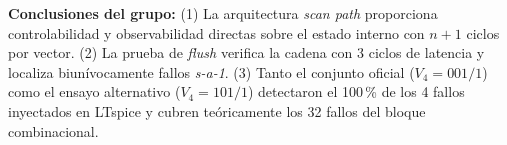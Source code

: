 \documentclass[10pt,a4paper]{article}
\begin{document}
\textbf{Conclusiones del grupo:} (1) La arquitectura \emph{scan path} proporciona controlabilidad y observabilidad directas sobre el estado interno con $n+1$ ciclos por vector. (2) La prueba de \emph{flush} verifica la cadena con 3 ciclos de latencia y localiza biunívocamente fallos \emph{s-a-1}. (3) Tanto el conjunto oficial ($V_4=001/1$) como el ensayo alternativo ($V_4=101/1$) detectaron el 100\,\% de los 4 fallos inyectados en LTspice y cubren teóricamente los 32 fallos del bloque combinacional.
\end{document}
